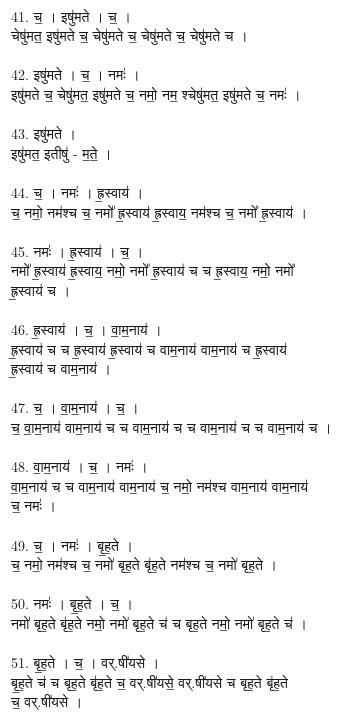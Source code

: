 \\
41. च॒ । इषु॑मते । च॒ ।\\
चेषु॑मत॒ इषु॑मते च॒ चेषु॑मते च॒ चेषु॑मते च॒ चेषु॑मते च ।\\
\\
42. इषु॑मते । च॒ । नमः॑ ।\\
इषु॑मते च॒ चेषु॑मत॒ इषु॑मते च॒ नमो॒ नम॒ श्चेषु॑मत॒ इषु॑मते च॒ नमः॑ ।\\
\\
43. इषु॑मते ।\\
इषु॑मत॒ इतीषु॑ - म॒ते॒ ।\\
\\
44. च॒ । नमः॑ । ह्र॒स्वाय॑ ।\\
च॒ नमो॒ नम॑श्च च॒ नमो᳚ ह्र॒स्वाय॑ ह्र॒स्वाय॒ नम॑श्च च॒ नमो᳚ ह्र॒स्वाय॑ ।\\
\\
45. नमः॑ । ह्र॒स्वाय॑ । च॒ ।\\
नमो᳚ ह्र॒स्वाय॑ ह्र॒स्वाय॒ नमो॒ नमो᳚ ह्र॒स्वाय॑ च च ह्र॒स्वाय॒ नमो॒ नमो᳚\\
ह्र॒स्वाय॑ च ।\\
\\
46. ह्र॒स्वाय॑ । च॒ । वा॒म॒नाय॑ ।\\
ह्र॒स्वाय॑ च च ह्र॒स्वाय॑ ह्र॒स्वाय॑ च वाम॒नाय॑ वाम॒नाय॑ च ह्र॒स्वाय॑\\
ह्र॒स्वाय॑ च वाम॒नाय॑ ।\\
\\
47. च॒ । वा॒म॒नाय॑ । च॒ ।\\
च॒ वा॒म॒नाय॑ वाम॒नाय॑ च च वाम॒नाय॑ च च वाम॒नाय॑ च च वाम॒नाय॑ च ।\\
\\
48. वा॒म॒नाय॑ । च॒ । नमः॑ ।\\
वा॒म॒नाय॑ च च वाम॒नाय॑ वाम॒नाय॑ च॒ नमो॒ नम॑श्च वाम॒नाय॑ वाम॒नाय॑\\
च॒ नमः॑ ।\\
\\
49. च॒ । नमः॑ । बृ॒ह॒ते ।\\
च॒ नमो॒ नम॑श्च च॒ नमो॑ बृह॒ते बृ॑ह॒ते नम॑श्च च॒ नमो॑ बृह॒ते ।\\
\\
50. नमः॑ । बृ॒ह॒ते । च॒ ।\\
नमो॑ बृह॒ते बृ॑ह॒ते नमो॒ नमो॑ बृह॒ते च॑ च बृह॒ते नमो॒ नमो॑ बृह॒ते च॑ ।\\
\\
51. बृ॒ह॒ते । च॒ । वर्.षी॑यसे ।\\
बृ॒ह॒ते च॑ च बृह॒ते बृ॑ह॒ते च॒ वर्.षी॑यसे॒ वर्.षी॑यसे च बृह॒ते बृ॑ह॒ते\\
च॒ वर्.षी॑यसे ।\\

